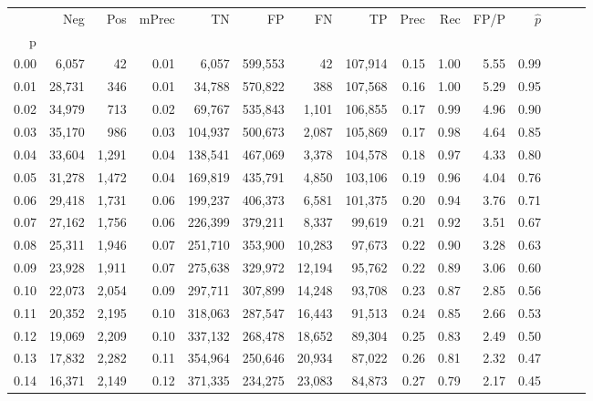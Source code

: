 \begin{tabular}{rrrrrrrrrrrrrrr}
\toprule
{} &     Neg &    Pos & mPrec &       TN &       FP &       FN &       TP &  Prec &   Rec &  FP/P & $\hat{p}$ \\
p    &         &        &       &          &          &          &          &       &       &       &           \\
\midrule
0.00 &   6,057 &     42 &  0.01 &    6,057 &  599,553 &       42 &  107,914 &  0.15 &  1.00 &  5.55 &      0.99 \\
0.01 &  28,731 &    346 &  0.01 &   34,788 &  570,822 &      388 &  107,568 &  0.16 &  1.00 &  5.29 &      0.95 \\
0.02 &  34,979 &    713 &  0.02 &   69,767 &  535,843 &    1,101 &  106,855 &  0.17 &  0.99 &  4.96 &      0.90 \\
0.03 &  35,170 &    986 &  0.03 &  104,937 &  500,673 &    2,087 &  105,869 &  0.17 &  0.98 &  4.64 &      0.85 \\
0.04 &  33,604 &  1,291 &  0.04 &  138,541 &  467,069 &    3,378 &  104,578 &  0.18 &  0.97 &  4.33 &      0.80 \\
0.05 &  31,278 &  1,472 &  0.04 &  169,819 &  435,791 &    4,850 &  103,106 &  0.19 &  0.96 &  4.04 &      0.76 \\
0.06 &  29,418 &  1,731 &  0.06 &  199,237 &  406,373 &    6,581 &  101,375 &  0.20 &  0.94 &  3.76 &      0.71 \\
0.07 &  27,162 &  1,756 &  0.06 &  226,399 &  379,211 &    8,337 &   99,619 &  0.21 &  0.92 &  3.51 &      0.67 \\
0.08 &  25,311 &  1,946 &  0.07 &  251,710 &  353,900 &   10,283 &   97,673 &  0.22 &  0.90 &  3.28 &      0.63 \\
0.09 &  23,928 &  1,911 &  0.07 &  275,638 &  329,972 &   12,194 &   95,762 &  0.22 &  0.89 &  3.06 &      0.60 \\
0.10 &  22,073 &  2,054 &  0.09 &  297,711 &  307,899 &   14,248 &   93,708 &  0.23 &  0.87 &  2.85 &      0.56 \\
0.11 &  20,352 &  2,195 &  0.10 &  318,063 &  287,547 &   16,443 &   91,513 &  0.24 &  0.85 &  2.66 &      0.53 \\
0.12 &  19,069 &  2,209 &  0.10 &  337,132 &  268,478 &   18,652 &   89,304 &  0.25 &  0.83 &  2.49 &      0.50 \\
0.13 &  17,832 &  2,282 &  0.11 &  354,964 &  250,646 &   20,934 &   87,022 &  0.26 &  0.81 &  2.32 &      0.47 \\
0.14 &  16,371 &  2,149 &  0.12 &  371,335 &  234,275 &   23,083 &   84,873 &  0.27 &  0.79 &  2.17 &      0.45 \\

\end{tabular}
